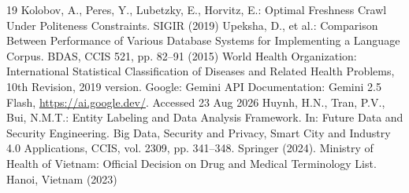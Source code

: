 \documentclass[runningheads]{llncs}
\begin{document}
\begin{thebibliography}{19}
 Kolobov, A., Peres, Y., Lubetzky, E., Horvitz, E.: Optimal Freshness Crawl Under Politeness Constraints. SIGIR (2019)
 Upeksha, D., et al.: Comparison Between Performance of Various Database Systems for Implementing a Language Corpus. BDAS, CCIS 521, pp. 82--91 (2015)
 World Health Organization: International Statistical Classification of Diseases and Related Health Problems, 10th Revision, 2019 version.
 Google: Gemini API Documentation: Gemini 2.5 Flash, \url{https://ai.google.dev/}. Accessed 23 Aug 2026
 Huynh, H.N., Tran, P.V., Bui, N.M.T.: Entity Labeling and Data Analysis Framework. In: Future Data and Security Engineering. Big Data, Security and Privacy, Smart City and Industry 4.0 Applications, CCIS, vol. 2309, pp. 341--348. Springer (2024). 
 Ministry of Health of Vietnam: Official Decision on Drug and Medical Terminology List. Hanoi, Vietnam (2023)
\end{thebibliography}
\end{document}
